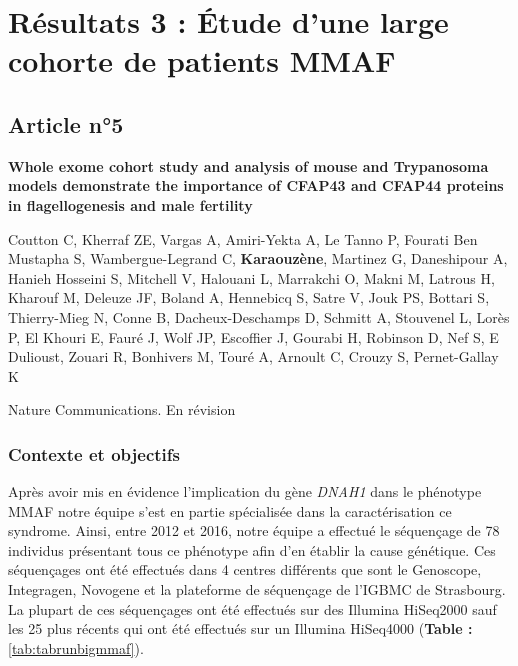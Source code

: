 \documentclass[12pt,a4paper,twoside]{ugathesis}
\theoremstyle{definition}
\theoremstyle{definition}
\theoremstyle{definition}
\theoremstyle{remark}
\begin{document}
\newpage  

\section{Résultats 3 : Étude d'une large cohorte de patients
MMAF}\label{resultats-3-etude-dune-large-cohorte-de-patients-mmaf}

\subsection{Article n°5}\label{article-n5}

\textbf{Whole exome cohort study and analysis of mouse and Trypanosoma
models demonstrate the importance of CFAP43 and CFAP44 proteins in
flagellogenesis and male fertility}

Coutton C, Kherraf ZE, Vargas A, Amiri-Yekta A, Le Tanno P, Fourati Ben
Mustapha S, Wambergue-Legrand C, \textbf{Karaouzène}, Martinez G,
Daneshipour A, Hanieh Hosseini S, Mitchell V, Halouani L, Marrakchi O,
Makni M, Latrous H, Kharouf M, Deleuze JF, Boland A, Hennebicq S, Satre
V, Jouk PS, Bottari S, Thierry-Mieg N, Conne B, Dacheux-Deschamps D,
Schmitt A, Stouvenel L, Lorès P, El Khouri E, Fauré J, Wolf JP,
Escoffier J, Gourabi H, Robinson D, Nef S, E Dulioust, Zouari R,
Bonhivers M, Touré A, Arnoult C, Crouzy S, Pernet-Gallay K

Nature Communications. En révision

\newpage

\subsubsection{Contexte et objectifs}\label{contexte-et-objectifs-4}

Après avoir mis en évidence l'implication du gène \emph{DNAH1} dans le
phénotype MMAF notre équipe s'est en partie spécialisée dans la
caractérisation ce syndrome. Ainsi, entre 2012 et 2016, notre équipe a
effectué le séquençage de 78 individus présentant tous ce phénotype afin
d'en établir la cause génétique. Ces séquençages ont été effectués dans
4 centres différents que sont le Genoscope, Integragen, Novogene et la
plateforme de séquençage de l'IGBMC de Strasbourg. La plupart de ces
séquençages ont été effectués sur des Illumina HiSeq2000 sauf les 25
plus récents qui ont été effectués sur un Illumina HiSeq4000
(\textbf{Table : }\ref{tab:tabrunbigmmaf}).
\end{document}
